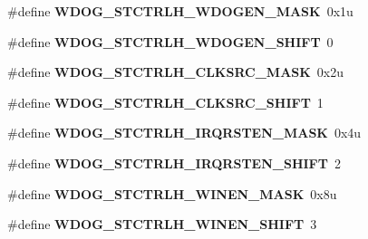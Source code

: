 \begin{DoxyCompactItemize}
\item 
\#define {\bfseries W\+D\+O\+G\+\_\+\+S\+T\+C\+T\+R\+L\+H\+\_\+\+W\+D\+O\+G\+E\+N\+\_\+\+M\+A\+SK}~0x1u\hypertarget{group__WDOG__Register__Masks_ga4ca33884d6a6fed2670ba04150fbff3a}{}\label{group__WDOG__Register__Masks_ga4ca33884d6a6fed2670ba04150fbff3a}

\item 
\#define {\bfseries W\+D\+O\+G\+\_\+\+S\+T\+C\+T\+R\+L\+H\+\_\+\+W\+D\+O\+G\+E\+N\+\_\+\+S\+H\+I\+FT}~0\hypertarget{group__WDOG__Register__Masks_ga7d9c369fd8fe12905d3e4b2d94bfe9be}{}\label{group__WDOG__Register__Masks_ga7d9c369fd8fe12905d3e4b2d94bfe9be}

\item 
\#define {\bfseries W\+D\+O\+G\+\_\+\+S\+T\+C\+T\+R\+L\+H\+\_\+\+C\+L\+K\+S\+R\+C\+\_\+\+M\+A\+SK}~0x2u\hypertarget{group__WDOG__Register__Masks_gaf3ab71b185905c077887baa062ad6664}{}\label{group__WDOG__Register__Masks_gaf3ab71b185905c077887baa062ad6664}

\item 
\#define {\bfseries W\+D\+O\+G\+\_\+\+S\+T\+C\+T\+R\+L\+H\+\_\+\+C\+L\+K\+S\+R\+C\+\_\+\+S\+H\+I\+FT}~1\hypertarget{group__WDOG__Register__Masks_gaa437494e2c4bb2952986b89d4a52f2bf}{}\label{group__WDOG__Register__Masks_gaa437494e2c4bb2952986b89d4a52f2bf}

\item 
\#define {\bfseries W\+D\+O\+G\+\_\+\+S\+T\+C\+T\+R\+L\+H\+\_\+\+I\+R\+Q\+R\+S\+T\+E\+N\+\_\+\+M\+A\+SK}~0x4u\hypertarget{group__WDOG__Register__Masks_ga64ebb40c66318cac7631c3fd467c846a}{}\label{group__WDOG__Register__Masks_ga64ebb40c66318cac7631c3fd467c846a}

\item 
\#define {\bfseries W\+D\+O\+G\+\_\+\+S\+T\+C\+T\+R\+L\+H\+\_\+\+I\+R\+Q\+R\+S\+T\+E\+N\+\_\+\+S\+H\+I\+FT}~2\hypertarget{group__WDOG__Register__Masks_ga0b519bf4ae17a11b51878819d4249e00}{}\label{group__WDOG__Register__Masks_ga0b519bf4ae17a11b51878819d4249e00}

\item 
\#define {\bfseries W\+D\+O\+G\+\_\+\+S\+T\+C\+T\+R\+L\+H\+\_\+\+W\+I\+N\+E\+N\+\_\+\+M\+A\+SK}~0x8u\hypertarget{group__WDOG__Register__Masks_ga74edc83d2a673f012aeff6410a8be861}{}\label{group__WDOG__Register__Masks_ga74edc83d2a673f012aeff6410a8be861}

\item 
\#define {\bfseries W\+D\+O\+G\+\_\+\+S\+T\+C\+T\+R\+L\+H\+\_\+\+W\+I\+N\+E\+N\+\_\+\+S\+H\+I\+FT}~3\hypertarget{group__WDOG__Register__Masks_gae0770ee0a74441bd3d2e0d3c291ca4b6}{}\label{group__WDOG__Register__Masks_gae0770ee0a74441bd3d2e0d3c291ca4b6}


\end{DoxyCompactItemize}
